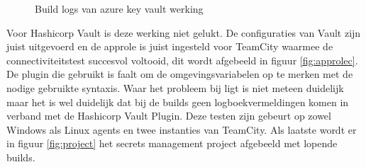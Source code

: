 \begin{figure}[!htb]
    \centering
    \caption{Build logs van azure key vault werking \autocite{teamcity}}
    \label{fig:azurescripts}
\end{figure}
\newpage

Voor Hashicorp Vault is deze werking niet gelukt. De configuraties van Vault zijn juist uitgevoerd en de approle is juist ingesteld voor TeamCity waarmee de connectiviteitstest succesvol voltooid, dit wordt afgebeeld in figuur \ref{fig:approlec}. De plugin die gebruikt is faalt om de omgevingsvariabelen op te merken met de nodige gebruikte syntaxis. Waar het probleem bij ligt is niet meteen duidelijk maar het is wel duidelijk dat bij de builds geen logboekvermeldingen komen in verband met de Hashicorp Vault Plugin. Deze testen zijn gebeurt op zowel Windows als Linux agents en twee instanties van TeamCity. Als laatste wordt er in figuur \ref{fig:project} het secrets management project afgebeeld met lopende builds.


